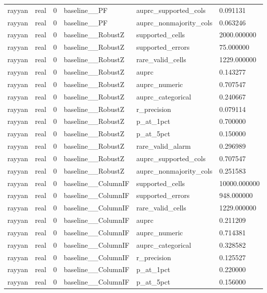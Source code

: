 \begin{tabular}{llllll}
rayyan & real & 0 & baseline\_\_PF & auprc\_supported\_cols & 0.091131 \\
rayyan & real & 0 & baseline\_\_PF & auprc\_nonmajority\_cols & 0.063246 \\
rayyan & real & 0 & baseline\_\_RobustZ & supported\_cells & 2000.000000 \\
rayyan & real & 0 & baseline\_\_RobustZ & supported\_errors & 75.000000 \\
rayyan & real & 0 & baseline\_\_RobustZ & rare\_valid\_cells & 1229.000000 \\
rayyan & real & 0 & baseline\_\_RobustZ & auprc & 0.143277 \\
rayyan & real & 0 & baseline\_\_RobustZ & auprc\_numeric & 0.707547 \\
rayyan & real & 0 & baseline\_\_RobustZ & auprc\_categorical & 0.240667 \\
rayyan & real & 0 & baseline\_\_RobustZ & r\_precision & 0.079114 \\
rayyan & real & 0 & baseline\_\_RobustZ & p\_at\_1pct & 0.700000 \\
rayyan & real & 0 & baseline\_\_RobustZ & p\_at\_5pct & 0.150000 \\
rayyan & real & 0 & baseline\_\_RobustZ & rare\_valid\_alarm & 0.296989 \\
rayyan & real & 0 & baseline\_\_RobustZ & auprc\_supported\_cols & 0.707547 \\
rayyan & real & 0 & baseline\_\_RobustZ & auprc\_nonmajority\_cols & 0.251583 \\
rayyan & real & 0 & baseline\_\_ColumnIF & supported\_cells & 10000.000000 \\
rayyan & real & 0 & baseline\_\_ColumnIF & supported\_errors & 948.000000 \\
rayyan & real & 0 & baseline\_\_ColumnIF & rare\_valid\_cells & 1229.000000 \\
rayyan & real & 0 & baseline\_\_ColumnIF & auprc & 0.211209 \\
rayyan & real & 0 & baseline\_\_ColumnIF & auprc\_numeric & 0.714381 \\
rayyan & real & 0 & baseline\_\_ColumnIF & auprc\_categorical & 0.328582 \\
rayyan & real & 0 & baseline\_\_ColumnIF & r\_precision & 0.125527 \\
rayyan & real & 0 & baseline\_\_ColumnIF & p\_at\_1pct & 0.220000 \\
rayyan & real & 0 & baseline\_\_ColumnIF & p\_at\_5pct & 0.156000 \\

\end{tabular}
